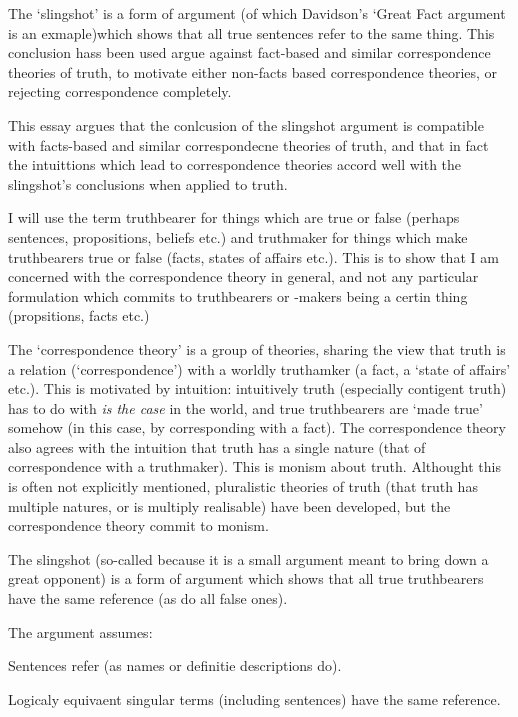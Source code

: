 The `slingshot' is a form of argument (of which Davidson's `Great Fact argument is an exmaple)which shows that all true sentences refer to the same thing.
This conclusion hass been used argue against fact-based and similar correspondence theories of truth, to motivate either non-facts based correspondence theories, or rejecting correspondence completely.

This essay argues that the conlcusion of the slingshot argument is compatible with facts-based and similar correspondecne theories of truth, and that in fact the intuittions which lead to correspondence theories accord well with the slingshot's conclusions when applied to truth.

I will use the term truthbearer for things which are true or false (perhaps sentences, propositions, beliefs etc.) and truthmaker for things which make truthbearers true or false (facts, states of affairs etc.).
This is to show that I am concerned with the correspondence theory in general, and not any particular formulation which commits to truthbearers or -makers being a certin thing (propsitions, facts etc.)

The `correspondence theory' is a group of theories, sharing the view that truth is a relation (`correspondence') with a worldly truthamker (a fact, a `state of affairs' etc.).
This is motivated by intuition: intuitively truth  (especially contigent truth) has to do with \emph{is the case} in the world, and true truthbearers are `made true' somehow (in this case, by corresponding with a fact).
The correspondence theory also agrees with the intuition that truth has a single nature (that of correspondence with a truthmaker).
This is monism about truth.
Althought this is often not explicitly mentioned, pluralistic theories of truth (that truth has multiple natures, or is multiply realisable) have been developed, but the correspondence theory commit to monism.

The slingshot (so-called because it is a small argument meant to bring down a great opponent) is a form of argument which shows that all true truthbearers have the same reference (as do all false ones).

The argument assumes:

	\begin{thesis} \label{srefer}
	Sentences refer (as names or definitie descriptions do).
	\end{thesis}


	\begin{thesis} \label{sameref}
	Logicaly equivaent singular terms (including sentences) have the same reference.
	\end{thesis}

